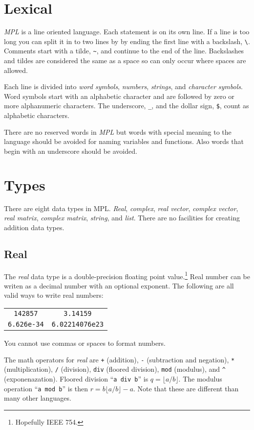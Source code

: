 \documentclass{article}
\begin{document}
\section{Lexical}
\emph{MPL} is a line oriented language.
Each statement is on its own line.
If a line is too long you can split it in to two lines by by ending
the first line with a backslash, \verb|\|.
Comments start with a tilde, \verb|~|, and continue to the end of the line.
Backslashes and tildes are considered the same as a space so can only occur
where spaces are allowed.

Each line is divided into \emph{word symbols}, \emph{numbers},
\emph{strings}, and \emph{character symbols}.
Word symbols start with an alphabetic character and are followed by
zero or more alphanumeric characters.
The underscore, \verb|_|, and the dollar sign, \verb|$|, count as
alphabetic characters.

There are no reserved words in \emph{MPL} but words with special meaning
to the language should be avoided for naming variables and functions.
Also words that begin with an underscore should be avoided.

\section{Types}
There are eight data types in MPL. \emph{Real}, \emph{complex},
\emph{real vector}, \emph{complex vector}, \emph{real matrix}, \emph{complex matrix}, \emph{string}, and \emph{list}. There are no facilities for creating
addition data types.

\subsection{Real}
The \emph{real} data type is a double-precision floating point value.\footnote{Hopefully IEEE 754.}
Real number can be writen as a decimal number with an optional exponent.
The following are all valid ways to write real numbers:
\begin{center}
  \begin{tabular}{cc}
    \verb|142857| &  \verb|3.14159| \\
    \verb|6.626e-34| & \verb|6.02214076e23|
  \end{tabular}
\end{center}
You cannot use commas or spaces to format numbers.

The math operators for \emph{real} are \verb|+| (addition),
\verb|-| (subtraction and negation), \verb|*| (multiplication),
\verb|/| (division), \verb|div| (floored division), \verb|mod| (modulus),
and \verb|^| (exponenazation).
Floored division ``\verb|a div b|'' is $q = \lfloor a/b \rfloor$.
The modulus operation ``\verb|a mod b|'' is then $r = b\lfloor a/b \rfloor - a$.
Note that these are different than many other languages.
\end{document}
